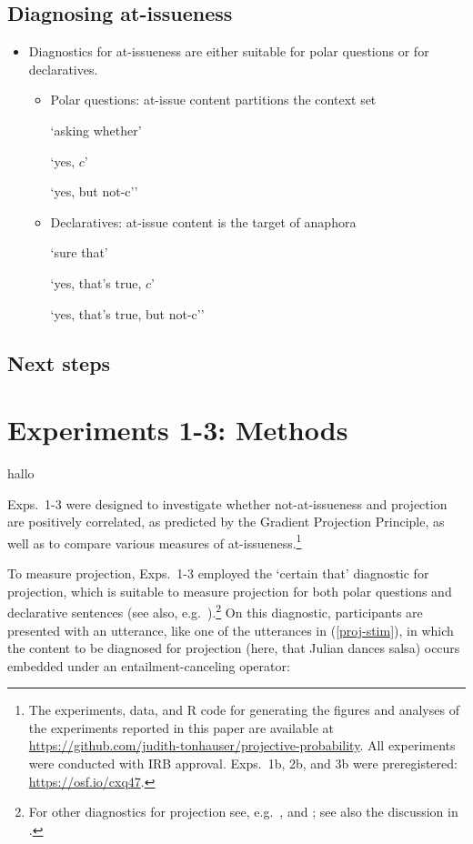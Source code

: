 \documentclass[11pt,fleqn]{article}
\newcommand{\6}{\mbox{$[\hspace*{-.6mm}[$}}
\newcommand{\9}{\mbox{$]\hspace*{-.6mm}]$}}
\begin{document}
\subsection{Diagnosing at-issueness}

\begin{itemize}

\item Diagnostics for at-issueness are either suitable for polar questions or for declaratives.

\begin{itemize}

\item Polar questions: at-issue content partitions the context set

`asking whether'

`yes, $c$'

`yes, but not-c''

\item Declaratives: at-issue content is the target of anaphora

`sure that'

`yes, that's true, $c$'

`yes, that's true, but not-c''

\end{itemize}

\end{itemize}

\subsection{Next steps}


\section{Experiments 1-3: Methods}\label{s2}

hallo

Exps.~1-3 were designed to investigate whether not-at-issueness and projection are positively correlated, as predicted by the Gradient Projection Principle, as well as to compare various measures of at-issueness.\footnote{\label{f-github}The experiments, data, and R code for generating the figures and analyses of the experiments reported in this paper are available at \url{https://github.com/judith-tonhauser/projective-probability}. All experiments were conducted with IRB approval. Exps.~1b, 2b, and 3b were preregistered: \url{https://osf.io/cxq47}.}

To measure projection, Exps.~1-3 employed the `certain that' diagnostic for projection, which is suitable to measure projection for both polar questions and declarative sentences (see also, e.g.\ \citealt{tonhauser-salt26,djaerv-bacovcin-salt27,stevens-etal2017,lorson2018,tbd-variability,mahler-nels,mahler2020,demarneffe-etal-sub23}).\footnote{For other diagnostics for projection see, e.g.\ \citealt{smith-hall11,xue-onea11}, and \citealt{brst-lang11}; see also the discussion in \citealt{tbd-variability}.}  On this diagnostic, participants are presented with an utterance, like one of the utterances in (\ref{proj-stim}), in which the content to be diagnosed for projection (here, that Julian dances salsa) occurs embedded under an entailment-canceling operator:
\end{document}
